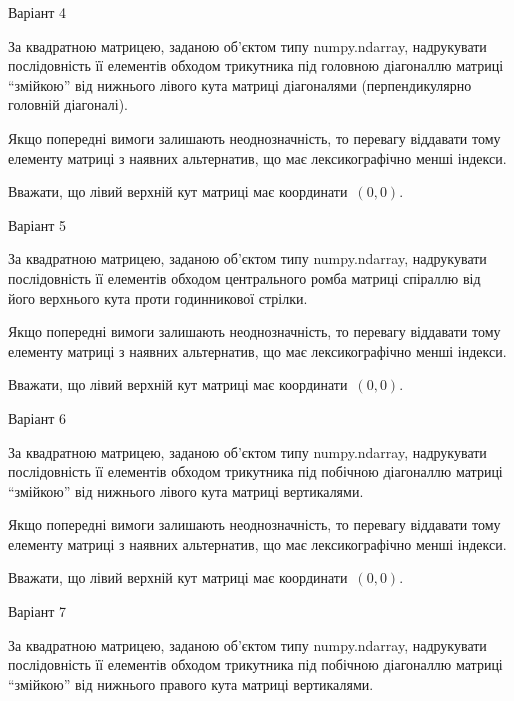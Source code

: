 \documentclass[11pt]{article}
\begin{document}
{\Large \center  Варіант  4\par \bigskip\bigskip}

За квадратною матрицею, заданою об'єктом типу numpy.ndarray, надрукувати послідовність її елементів обходом трикутника під головною діагоналлю матриці ``змійкою'' від нижнього лівого кута матриці діагоналями (перпендикулярно головній діагоналі).

\vspace{2mm}
Якщо попередні вимоги залишають неоднозначність, то перевагу віддавати тому елементу матриці з наявних альтернатив, що має лексикографічно менші індекси.

Вважати, що лівий верхній кут матриці має координати~$(0,0)$.



{\Large \center  Варіант  5\par \bigskip\bigskip}

За квадратною матрицею, заданою об'єктом типу numpy.ndarray, надрукувати послідовність її елементів обходом центрального ромба матриці спіраллю від його верхнього кута проти годинникової стрілки.

\vspace{2mm}
Якщо попередні вимоги залишають неоднозначність, то перевагу віддавати тому елементу матриці з наявних альтернатив, що має лексикографічно менші індекси.

Вважати, що лівий верхній кут матриці має координати~$(0,0)$.



{\Large \center  Варіант  6\par \bigskip\bigskip}

За квадратною матрицею, заданою об'єктом типу numpy.ndarray, надрукувати послідовність її елементів обходом трикутника під побічною діагоналлю матриці ``змійкою'' від нижнього лівого кута матриці вертикалями.

\vspace{2mm}
Якщо попередні вимоги залишають неоднозначність, то перевагу віддавати тому елементу матриці з наявних альтернатив, що має лексикографічно менші індекси.

Вважати, що лівий верхній кут матриці має координати~$(0,0)$.



{\Large \center  Варіант  7\par \bigskip\bigskip}

За квадратною матрицею, заданою об'єктом типу numpy.ndarray, надрукувати послідовність її елементів обходом трикутника під побічною діагоналлю матриці ``змійкою'' від нижнього правого кута матриці вертикалями.
\end{document}
